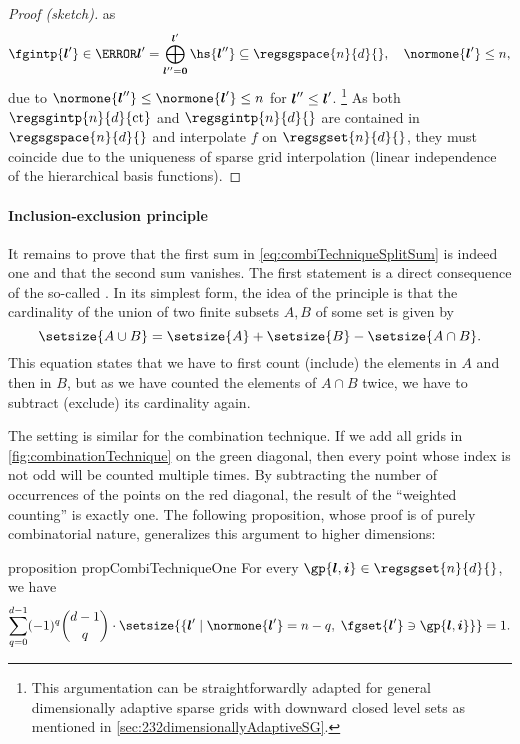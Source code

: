 \begin{proof}[Proof (sketch)]
  as
  \begin{equation}
    \fgintp{\*l'} \in
    \ns{\*l'}
    = \bigoplus_{\*l''=\*0}^{\*l'} \hs{\*l''}
    \subset \regsgspace{n}{d}{},\quad
    \normone{\*l'} \le n,
  \end{equation}
  due to $\normone{\*l''} \le \normone{\*l'} \le n$
  for ${\boldsymbol{l}}'' \le {\boldsymbol{l}}'$.%
  \footnote{%
    This argumentation can be straightforwardly adapted
    for general dimensionally adaptive sparse grids
    with downward closed level sets as mentioned in
    \cref{sec:232dimensionallyAdaptiveSG}.%
  }
  As both $\regsgintp{n}{d}{\ct}$ and $\regsgintp{n}{d}{}$
  are contained in $\regsgspace{n}{d}{}$ and
  interpolate $f$ on $\regsgset{n}{d}{}$, they must coincide
  due to the uniqueness of sparse grid interpolation
  (linear independence of the hierarchical basis functions).
\end{proof}

\paragraph{Inclusion-exclusion principle}

It remains to prove that the first sum in \eqref{eq:combiTechniqueSplitSum}
is indeed one and that the second sum vanishes.
The first statement is a direct consequence of the so-called
.
In its simplest form, the idea of the principle is that the cardinality
of the union of two finite subsets $A, B$ of some set is given by
\begin{equation}
  \setsize{A \cup B}
  = \setsize{A} + \setsize{B} - \setsize{A \cap B}.
\end{equation}
This equation states that we have to first count (include)
the elements in $A$ and then in $B$,
but as we have counted the elements of $A \cap B$ twice,
we have to subtract (exclude) its cardinality again.

The setting is similar for the combination technique.
If we add all grids in \cref{fig:combinationTechnique}
on the green diagonal, then every point whose index is not odd
will be counted multiple times.
By subtracting the number of occurrences of the points on the
red diagonal,
the result of the ``weighted counting'' is exactly one.
The following proposition, whose proof is of purely combinatorial nature,
generalizes this argument to higher dimensions:

\begin{restatable}{%
  proposition%
}{%
  propCombiTechniqueOne%
}
  \label{prop:combiTechniqueOne}
  For every $\gp{\*l,\*i} \in \regsgset{n}{d}{}$, we have
  \begin{equation}
    \label{eq:combiTechniqueOne}
    \sum_{q=0}^{d-1} (-1)^q \binom{d-1}{q} \cdot
    \setsize{
      \{\*l' \mid \normone{\*l'} = n - q,\; \fgset{\*l'} \ni \gp{\*l,\*i}\}
    }
    = 1.
  \end{equation}
\end{restatable}

